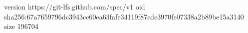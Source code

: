 version https://git-lfs.github.com/spec/v1
oid sha256:67a7659796dc3943cc60ea63fafe34119f87cde3970fe07338a2b89be15a3140
size 196704
